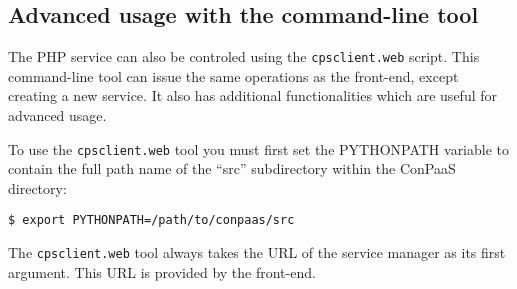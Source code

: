\documentclass[10pt]{article}
\begin{document}
\subsection{Advanced usage with the command-line tool}

The PHP service can also be controled using the \texttt{cpsclient.web}
script. This command-line tool can issue the same operations as the
front-end, except creating a new service. It also has additional
functionalities which are useful for advanced usage.

To use the \texttt{cpsclient.web} tool you must first set the
PYTHONPATH variable to contain the full path name of the ``src''
subdirectory within the ConPaaS directory:
\begin{verbatim}
$ export PYTHONPATH=/path/to/conpaas/src
\end{verbatim}

The \texttt{cpsclient.web} tool always takes the URL of the service
manager as its first argument. This URL is provided by the front-end.

\vspace{1em}
\end{document}
